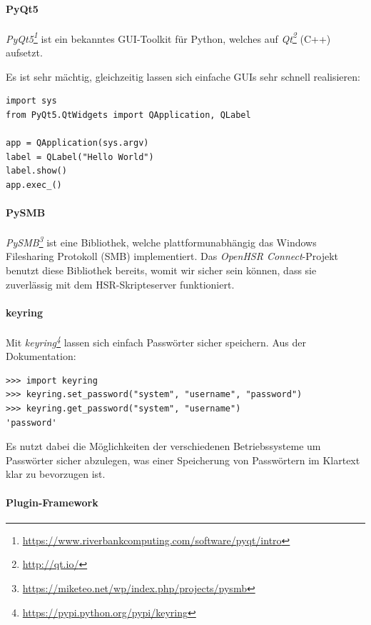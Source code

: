 \documentclass[a4paper]{article}
\newcommand{\tool}[2]{\emph{#1\footnote{\url{#2}}}}
\begin{document}
\paragraph{PyQt5}

\tool{PyQt5}{https://www.riverbankcomputing.com/software/pyqt/intro} ist ein
bekanntes GUI-Toolkit für Python, welches auf \tool{Qt}{http://qt.io/} (C++) aufsetzt.

Es ist sehr mächtig, gleichzeitig lassen sich einfache GUIs sehr schnell
realisieren:

\begin{verbatim}
import sys
from PyQt5.QtWidgets import QApplication, QLabel

app = QApplication(sys.argv)
label = QLabel("Hello World")
label.show()
app.exec_()
\end{verbatim}

\paragraph{PySMB}

\tool{PySMB}{https://miketeo.net/wp/index.php/projects/pysmb} ist eine
Bibliothek, welche plattformunabhängig das Windows Filesharing Protokoll (SMB)
implementiert. Das \emph{OpenHSR Connect}-Projekt benutzt diese Bibliothek
bereits, womit wir sicher sein können, dass sie zuverlässig mit dem
HSR-Skripteserver funktioniert.

\paragraph{keyring}

Mit \tool{keyring}{https://pypi.python.org/pypi/keyring} lassen sich einfach
Passwörter sicher speichern. Aus der Dokumentation:

\begin{verbatim}
>>> import keyring
>>> keyring.set_password("system", "username", "password")
>>> keyring.get_password("system", "username")
'password'
\end{verbatim}

Es nutzt dabei die Möglichkeiten der verschiedenen Betriebssysteme um Passwörter
sicher abzulegen, was einer Speicherung von Passwörtern im Klartext klar zu
bevorzugen ist.

\paragraph{Plugin-Framework}
\end{document}
